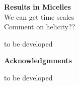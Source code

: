\documentclass{beamer}
\begin{document}
\begin{frame}
\LARGE{\centering
\textbf{Results in Micelles} \\
We can get time scales\\
Comment on helicity??


\vspace{1.5cm}

to be developed
}


\end{frame}



\begin{frame}
\LARGE{\centering
\textbf{Acknowledgmnents} \\


\vspace{1.5cm}

to be developed
}


\end{frame}

\end{document}
